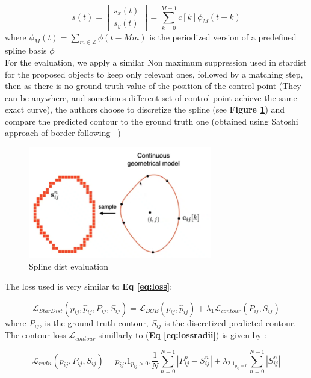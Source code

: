 \documentclass[main.tex]{subfiles}
\begin{document}
\begin{equation}
    s(t) = \left[ \begin{matrix}
        s_x(t)\\
        s_y(t)
    \end{matrix}\right] = \sum_{k=0}^{M-1} c[k]\mathcal{\phi}_M(t-k) 
\end{equation}
where $\phi_M(t) = \sum_{m \in \mathbb{Z}}{\phi(t - Mm)}$ is the periodized version of a predefined spline basis $\phi$\\


For the evaluation, we apply a similar Non maximum suppression used in stardist for the proposed objects to keep only relevant ones, followed by a matching step, then as there is no ground truth value of the position of the control point (They can be anywhere, and sometimes different set of control point achieve the same exact curve), the authors choose to discretize the spline  (see \textbf{Figure \ref{fig:gtcontour}}) and compare the predicted contour to the ground truth one (obtained using Satoshi approach of border following ~\cite{Suzuki1985})
\begin{figure}[H]
    \centering
    \includegraphics[width=8cm]{images/splinedistEval.PNG}
    \caption{Spline dist evaluation}
    \label{fig:gtcontour}
\end{figure}

The loss used is very similar to \textbf{Eq \ref{eq:loss}}:

\begin{equation}
    \mathcal{L}_{\mathit{StarDist}}(p_{ij}, \hat{p}_{ij}, P_{ij}, S_{ij}) = \mathcal{L}_{\mathit{BCE}}(p_{ij}, \hat{p}_{ij}) + \lambda_1\mathcal{L}_{\mathit{contour}}(P_{ij}, S_{ij}) 
\end{equation}
where $P_{ij}$, is the ground truth contour, $S_{ij}$ is the discretized predicted contour.\\

The contour loss $\mathcal{L}_{\mathit{contour}}$ simillarly to (\textbf{Eq \ref{eq:lossradii}}) is given by :

\begin{equation}
        \mathcal{L}_{\mathit{radii}}(p_{ij}, P_{ij}, S_{ij}) = p_{ij}.1_{p_{ij}>0}.\frac{1}{N}\sum_{n=0}^{N-1}|P_{ij}^{n}-S_{ij}^{n}| + \lambda_2.1_{p_{ij}=0}\sum_{n=0}^{N-1}|S_{ij}^{n}|
\end{equation}
\end{document}
